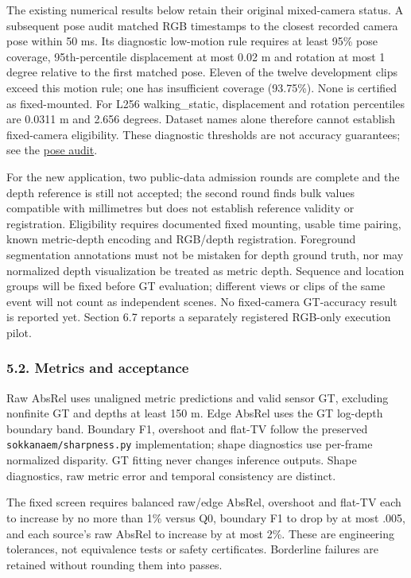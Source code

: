 \documentclass[
  10pt,
]{article}
\begin{document}
The existing numerical results below retain their original mixed-camera
status. A subsequent pose audit matched RGB timestamps to the closest
recorded camera pose within 50 ms. Its diagnostic low-motion rule
requires at least 95\% pose coverage, 95th-percentile displacement at
most 0.02 m and rotation at most 1 degree relative to the first matched
pose. Eleven of the twelve development clips exceed this motion rule;
one has insufficient coverage (93.75\%). None is certified as
fixed-mounted. For L256 walking\_static, displacement and rotation
percentiles are 0.0311 m and 2.656 degrees. Dataset names alone
therefore cannot establish fixed-camera eligibility. These diagnostic
thresholds are not accuracy guarantees; see the
\href{streaming_draft/CAMERA_POSE_AUDIT.md}{pose audit}.

For the new application, two public-data admission rounds are complete
and the depth reference is still not accepted; the second round finds
bulk values compatible with millimetres but does not establish reference
validity or registration. Eligibility requires documented fixed
mounting, usable time pairing, known metric-depth encoding and RGB/depth
registration. Foreground segmentation annotations must not be mistaken
for depth ground truth, nor may normalized depth visualization be
treated as metric depth. Sequence and location groups will be fixed
before GT evaluation; different views or clips of the same event will
not count as independent scenes. No fixed-camera GT-accuracy result is
reported yet. Section 6.7 reports a separately registered RGB-only
execution pilot.

\subsubsection{5.2. Metrics and
acceptance}\label{metrics-and-acceptance}

Raw AbsRel uses unaligned metric predictions and valid sensor GT,
excluding nonfinite GT and depths at least 150 m. Edge AbsRel uses the
GT log-depth boundary band. Boundary F1, overshoot and flat-TV follow
the preserved \texttt{sokkanaem/sharpness.py} implementation; shape
diagnostics use per-frame normalized disparity. GT fitting never changes
inference outputs. Shape diagnostics, raw metric error and temporal
consistency are distinct.

The fixed screen requires balanced raw/edge AbsRel, overshoot and
flat-TV each to increase by no more than 1\% versus Q0, boundary F1 to
drop by at most .005, and each source's raw AbsRel to increase by at
most 2\%. These are engineering tolerances, not equivalence tests or
safety certificates. Borderline failures are retained without rounding
them into passes.
\end{document}
